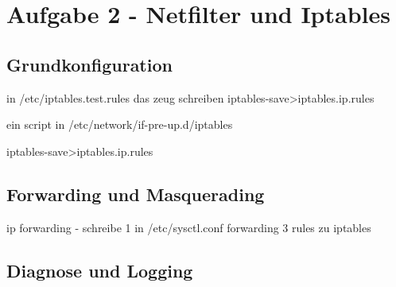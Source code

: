 \chapter{Aufgabe 2 - Netfilter und Iptables}
\section{Grundkonfiguration}
in /etc/iptables.test.rules das zeug schreiben
iptables-save>iptables.ip.rules

ein script in /etc/network/if-pre-up.d/iptables

iptables-save>iptables.ip.rules


\section{Forwarding und Masquerading}
ip  forwarding - schreibe 1 in /etc/sysctl.conf forwarding
3 rules zu iptables

\section{Diagnose und Logging}

